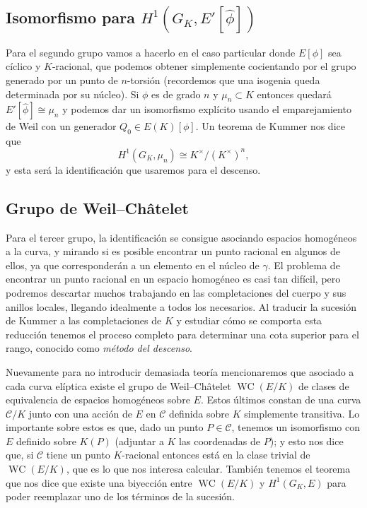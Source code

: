 \documentclass[a4paper]{book}
\theoremstyle{definition}
\theoremstyle{plain}
\newcommand{\cc}{\mathcal{C}}
\newcommand{\KmodN}{K^\times/{(K^\times)}^n}
\begin{document}
\subsection*{Isomorfismo para \texorpdfstring{$H^1(G_K,E'[\hat\phi])$}{H1(GK,E'[phi dual])}}

Para el segundo grupo vamos a hacerlo en el caso particular donde $E[\phi]$ sea cíclico y $K$-racional, que podemos obtener simplemente cocientando por el grupo generado por un punto de $n$-torsión (recordemos que una isogenia queda determinada por su núcleo). Si $\phi$ es de grado $n$ y $\mu_n \subset K$ entonces quedará $E'[\hat\phi] \cong \mu_n$ y podemos dar un isomorfismo explícito usando el emparejamiento de Weil con un generador $Q_0\in E(K)[\phi]$. Un teorema de Kummer nos dice que
\[
H^1(G_K,\mu_n) \cong \KmodN,
\]
y esta será la identificación que usaremos para el descenso.

\subsection*{Grupo de Weil--Châtelet}

Para el tercer grupo, la identificación se consigue asociando espacios homogéneos a la curva, y mirando si es posible encontrar un punto racional en algunos de ellos, ya que corresponderán a un elemento en el núcleo de $\gamma$. El problema de encontrar un punto racional en un espacio homogéneo es casi tan difícil, pero podremos descartar muchos trabajando en las completaciones del cuerpo y sus anillos locales, llegando idealmente a todos los necesarios. Al traducir la sucesión de Kummer a las completaciones de $K$ y estudiar cómo se comporta esta reducción tenemos el proceso completo para determinar una cota superior para el rango, conocido como \emph{método del descenso}.

Nuevamente para no introducir demasiada teoría mencionaremos que asociado a cada curva elíptica existe el grupo de Weil--Châtelet $\operatorname{WC}(E/K)$ de clases de equivalencia de espacios homogéneos sobre $E$. Estos últimos constan de una curva $\cc/K$ junto con una acción de $E$ en $\cc$ definida sobre $K$ simplemente transitiva. Lo importante sobre estos es que, dado un punto $P\in \cc$, tenemos un isomorfismo con $E$ definido sobre $K(P)$ (adjuntar a $K$ las coordenadas de $P$); y esto nos dice que, si $\cc$ tiene un punto $K$-racional entonces está en la clase trivial de $\operatorname{WC}(E/K)$, que es lo que nos interesa calcular. También tenemos el teorema que nos dice que existe una biyección entre $\operatorname{WC}(E/K)$ y $H^1(G_K,E)$ para poder reemplazar uno de los términos de la sucesión. 
\end{document}
